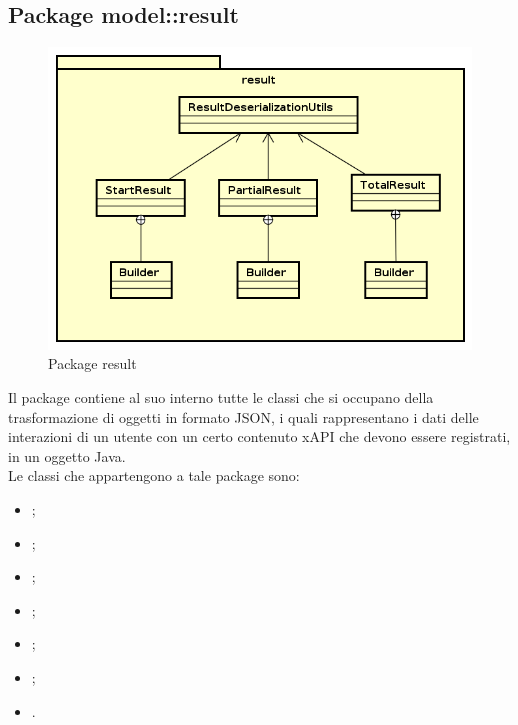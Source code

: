 \documentclass[../Tesi.tex]{subfiles}
\begin{document}
	\subsection{Package model::result}
		\begin{figure}[H]
			\centering
			\includegraphics[scale=0.6]{images/package_diagrams/result}
				\caption{Package result}
			\label{fig:StrutturaMVP}
		\end{figure}
		Il package  contiene al suo interno tutte le classi che si occupano della trasformazione di oggetti in formato JSON, i quali rappresentano i dati delle interazioni di un utente con un certo contenuto xAPI che devono essere registrati, in un oggetto Java. \\
		Le classi che appartengono a tale package sono:
		\begin{itemize}
			\item {};
			\item {};
			\item {};
			\item {};
			\item {};
			\item {};
			\item {}.
		\end{itemize}
\end{document}
